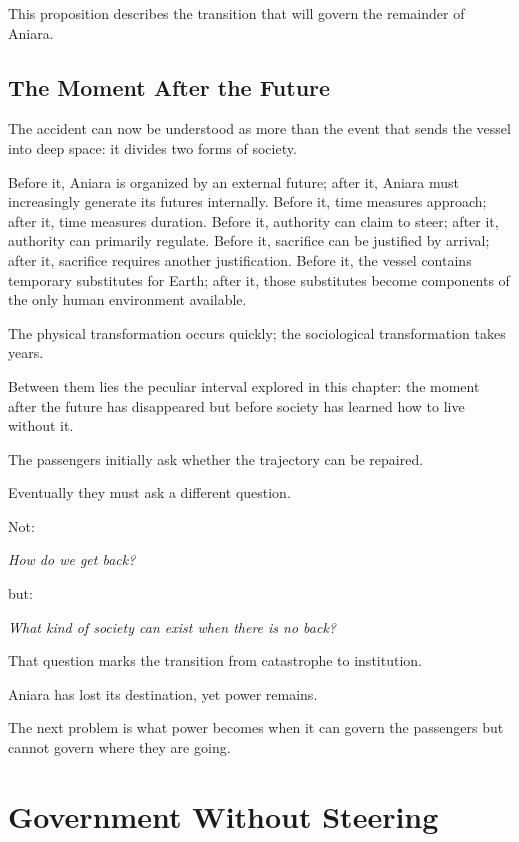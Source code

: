\documentclass[11pt,oneside]{book}
\theoremstyle{definition}
\theoremstyle{remark}
\begin{document}
This proposition describes the transition that will govern the remainder of Aniara.

\section{The Moment After the Future}

The accident can now be understood as more than the event that sends the vessel into deep space: it divides two forms of society.

Before it, Aniara is organized by an external future; after it, Aniara must increasingly generate its futures internally. Before it, time measures approach; after it, time measures duration. Before it, authority can claim to steer; after it, authority can primarily regulate. Before it, sacrifice can be justified by arrival; after it, sacrifice requires another justification. Before it, the vessel contains temporary substitutes for Earth; after it, those substitutes become components of the only human environment available.

The physical transformation occurs quickly; the sociological transformation takes years.

Between them lies the peculiar interval explored in this chapter: the moment after the future has disappeared but before society has learned how to live without it.

The passengers initially ask whether the trajectory can be repaired.

Eventually they must ask a different question.

Not:

\begin{center}
\emph{How do we get back?}
\end{center}

but:

\begin{center}
\emph{What kind of society can exist when there is no back?}
\end{center}

That question marks the transition from catastrophe to institution.

Aniara has lost its destination, yet power remains.

The next problem is what power becomes when it can govern the passengers but cannot govern where they are going.

\chapter{Government Without Steering}
\end{document}
